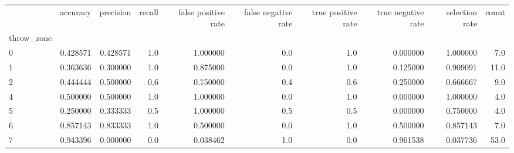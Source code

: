 \begin{tabular}{lrrrrrrrrr}
\toprule
{} &  accuracy &  precision &  recall &  false positive rate &  false negative rate &  true positive rate &  true negative rate &  selection rate &  count \\
throw\_zone &           &            &         &                      &                      &                     &                     &                 &        \\
\midrule
0          &  0.428571 &   0.428571 &     1.0 &             1.000000 &                  0.0 &                 1.0 &            0.000000 &        1.000000 &    7.0 \\
1          &  0.363636 &   0.300000 &     1.0 &             0.875000 &                  0.0 &                 1.0 &            0.125000 &        0.909091 &   11.0 \\
2          &  0.444444 &   0.500000 &     0.6 &             0.750000 &                  0.4 &                 0.6 &            0.250000 &        0.666667 &    9.0 \\
4          &  0.500000 &   0.500000 &     1.0 &             1.000000 &                  0.0 &                 1.0 &            0.000000 &        1.000000 &    4.0 \\
5          &  0.250000 &   0.333333 &     0.5 &             1.000000 &                  0.5 &                 0.5 &            0.000000 &        0.750000 &    4.0 \\
6          &  0.857143 &   0.833333 &     1.0 &             0.500000 &                  0.0 &                 1.0 &            0.500000 &        0.857143 &    7.0 \\
7          &  0.943396 &   0.000000 &     0.0 &             0.038462 &                  1.0 &                 0.0 &            0.961538 &        0.037736 &   53.0 \\
\bottomrule
\end{tabular}
